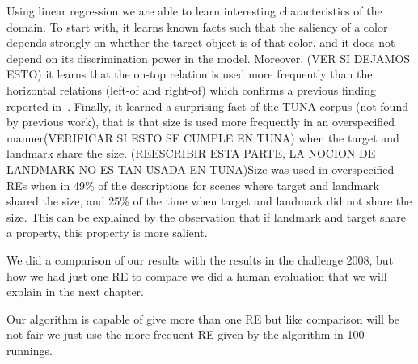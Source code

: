 Using linear regression we are able to learn interesting characteristics of the domain. To start with, it learns known facts such that the 
saliency of a color depends strongly on whether the target object is of that color, and it does not depend on its discrimination power 
in the model. Moreover, (VER SI DEJAMOS ESTO) it learns that the on-top relation is used more frequently than the horizontal relations (left-of and right-of) 
which confirms a previous finding reported in~\cite{viet:gene11}. Finally, it learned a surprising fact of the TUNA corpus
 (not found by previous work), that is that size is used more frequently in an overspecified manner(VERIFICAR SI ESTO SE CUMPLE EN TUNA) when the target and landmark share the
 size. (REESCRIBIR ESTA PARTE, LA NOCION DE LANDMARK NO ES TAN USADA EN TUNA)Size was used in overspecified REs when in 49\% of the descriptions for scenes where target and landmark shared the size, and 25\% 
of the time when target and landmark did not share the size. This can be explained by the observation that if landmark and target share a
 property, this property is more salient. 

We did a comparison of our results with the results in the challenge 2008, but how we had just one RE to compare we did a human evaluation that we will explain in the next chapter.

Our algorithm is capable of give more than one RE but like comparison will be not fair we just use the more frequent RE given by the algorithm in 100 runnings.

